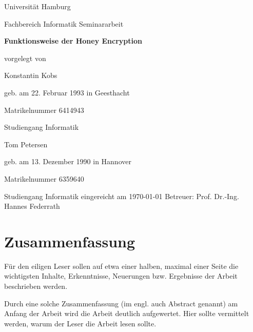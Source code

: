 \documentclass[12pt]{scrartcl}
\begin{document}
\newpage

\thispagestyle{empty}
\begin{center}\Large
Universität Hamburg \par
Fachbereich Informatik
\vfill
Seminararbeit
\vfill
{\Large\textsf{\textbf{Funktionsweise der Honey Encryption}}\par}
\vfill
vorgelegt von 
\par\bigskip
Konstantin Kobs \par
geb. am 22. Februar 1993 in Geesthacht \par
Matrikelnummer 6414943 \par
Studiengang Informatik
\par\bigskip
Tom Petersen \par
geb. am 13. Dezember 1990 in Hannover \par
Matrikelnummer 6359640 \par
Studiengang Informatik
\vfill
eingereicht am \today
\vfill 
Betreuer: Prof. Dr.-Ing. Hannes Federrath \par
\end{center}

\newpage
\section*{Zusammenfassung}

Für den eiligen Leser sollen auf etwa einer halben, maximal einer Seite die wichtigsten Inhalte, Erkenntnisse, Neuerungen bzw. Ergebnisse der Arbeit beschrieben werden. 

Durch eine solche Zusammenfassung (im engl. auch Abstract genannt) am Anfang der Arbeit wird die Arbeit deutlich aufgewertet. Hier sollte vermittelt werden, warum der Leser die Arbeit lesen sollte.

\newpage

\tableofcontents
\newpage













\begingroup
\let\itshape\upshape


\endgroup
\end{document}
